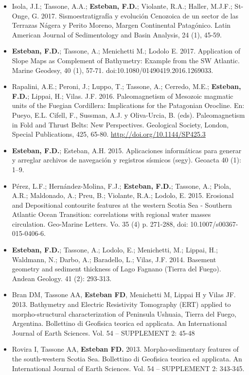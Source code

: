 \documentclass[11pt, a4paper]{article}
\begin{document}
\begin{itemize}
    \item Isola, J.I.; Tassone, A.A.; \textbf{Esteban, F.D.}; Violante, R.A.; Haller, M.J.F.; St-Onge, G. 2017. Sismoestratigrafía y evolución Cenozoica de un sector de las Terrazas Nágera y Perito Moreno, Margen Continental Patagónico. Latin American Journal of Sedimentology and Basin Analysis, 24 (1), 45-59.
    \item \textbf{Esteban, F.D.}; Tassone, A.; Menichetti M.; Lodolo E. 2017. Application of Slope Maps as Complement of Bathymetry: Example from the SW Atlantic. Marine Geodesy, 40 (1), 57-71. doi:10.1080/01490419.2016.1269033.
    \item Rapalini, A.E.; Peroni, J.; Luppo, T.; Tassone, A.; Cerredo, M.E.; \textbf{Esteban, F.D.}; Lippai, H.; Vilas. J.F. 2016. Paleomagnetism of Mesozoic magmatic units of the Fuegian Cordillera: Implications for the Patagonian Orocline. En: Pueyo, E.L. Cifell, F., Sussman, A.J. y Oliva-Urcia, B. (eds). Paleomagnetism in Fold and Thrust Belts: New Perspectives. Geological Society, London, Special Publications, 425, 65-80. \url{http://doi.org/10.1144/SP425.3}
    \item \textbf{Esteban, F.D.}; Esteban, A.H. 2015. Aplicaciones informáticas para generar y arreglar archivos de navegación y registros sísmicos (segy). Geoacta 40 (1): 1–9.
    \item Pérez, L.F.; Hernández-Molina, F.J.; \textbf{Esteban, F.D.}; Tassone, A.; Piola, A.R.; Maldonado, A.; Preu, B.; Violante, R.A.; Lodolo, E. 2015. Erosional and Depositional contourite features at the western Scotia Sea - Southern Atlantic Ocean Transition: correlations with regional water masses circulation. Geo-Marine Letters. Vo. 35 (4) p. 271-288, doi: 10.1007/s00367-015-0406-6.
    \item \textbf{Esteban, F.D.}; Tassone, A.; Lodolo, E.; Menichetti, M.; Lippai, H.; Waldmann, N.; Darbo, A.; Baradello, L.; Vilas, J.F. 2014. Basement geometry and sediment thickness of Lago Fagnano (Tierra del Fuego). Andean Geology. 41 (2): 293-313.
    \item Bran DM, Tassone AA, \textbf{Esteban FD}, Menichetti M, Lippai H y Vilas JF. 2013. Bathymetry and Electric Resistivity Tomography (ERT) applied to morpho-structural characterization of Peninsula Ushuaia, Tierra del Fuego, Argentina. Bollettino di Geofisica teorica ed applicata. An International Journal of Earth Sciences. Vol. 54 – SUPPLEMENT 2: 45-48
    \item Rovira I, Tassone AA, \textbf{Esteban FD.} 2013. Morpho-sedimentary features of the south-western Scotia Sea. Bollettino di Geofisica teorica ed applicata. An International Journal of Earth Sciences. Vol. 54 – SUPPLEMENT 2: 343-345.

\end{itemize}
\end{document}
